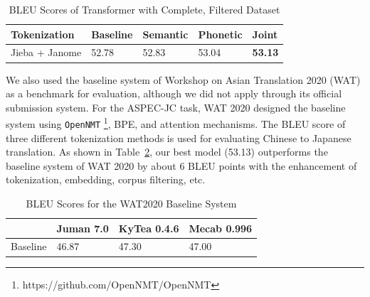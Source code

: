 \vspace{0.5cm}
\begin{table}[h]
    \centering
    \begin{tabularx}{\textwidth}{bbbbb}\toprule
        Tokenization & Baseline & Semantic & Phonetic & Joint \\\midrule
        Jieba + Janome & 52.78 & 52.83 & 53.04 & \textbf{53.13} \\\bottomrule
    \end{tabularx}
    \caption{BLEU Scores of Transformer with Complete, Filtered Dataset}
    \label{tab:transformer_filtered_bleu_score}
\end{table}

We also used the baseline system of Workshop on Asian Translation 2020 (WAT) \cite{nakazawa2020overview} as a benchmark for evaluation, although we did not apply through its official submission system. For the ASPEC-JC task, WAT 2020 designed the baseline system using \texttt{OpenNMT} \footnote{https://github.com/OpenNMT/OpenNMT}, BPE, and attention mechanisms. The BLEU score of three different tokenization methods is used for evaluating Chinese to Japanese translation. As shown in Table~\ref{tab:wat_2020}, our best model (53.13) outperforms the baseline system of WAT 2020 by about 6 BLEU points with the enhancement of tokenization, embedding, corpus filtering, etc.

\vspace{0.5cm}
\begin{table}[h]
    \centering
    \begin{tabularx}{\textwidth}{bbbb}\toprule
         & Juman 7.0 & KyTea 0.4.6 & Mecab 0.996 \\\midrule
        Baseline & 46.87 & 47.30 & 47.00 \\
    \end{tabularx}
    \caption{BLEU Scores for the WAT2020 Baseline System}
    \label{tab:wat_2020}
\end{table}




